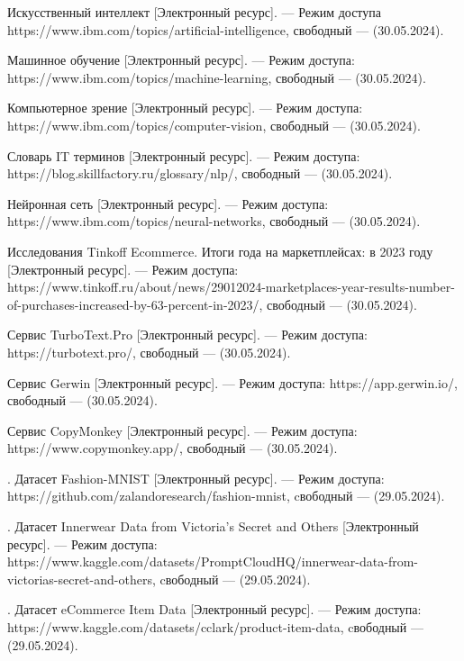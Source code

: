 \newpage 
\printbibliography[heading=bibintoc] 

\begin{thebibliography}{0}
	Искусственный интеллект [Электронный ресурс]. — Режим доступа https://www.ibm.com/topics/artificial-intelligence, свободный — (30.05.2024).
	
	Машинное обучение [Электронный ресурс]. — Режим доступа: https://www.ibm.com/topics/machine-learning, свободный — (30.05.2024).
	
	Компьютерное зрение [Электронный ресурс]. — Режим доступа: https://www.ibm.com/topics/computer-vision, свободный — (30.05.2024). 
	
	Словарь IT терминов [Электронный ресурс]. — Режим доступа: https://blog.skillfactory.ru/glossary/nlp/, свободный — (30.05.2024). 
	
	Нейронная сеть [Электронный ресурс]. — Режим доступа: https://www.ibm.com/topics/neural-networks, свободный — (30.05.2024). 
	
	Исследования Tinkoff Ecommerce. Итоги года на маркетплейсах: в 2023 году [Электронный ресурс]. — Режим доступа: https://www.tinkoff.ru/about/news/29012024-marketplaces-year-results-number-of-purchases-increased-by-63-percent-in-2023/, свободный — (30.05.2024).
	
	Сервис TurboText.Pro [Электронный ресурс]. — Режим доступа: https://turbotext.pro/, свободный — (30.05.2024).
	
	Сервис Gerwin [Электронный ресурс]. — Режим доступа: https://app.gerwin.io/, свободный — (30.05.2024).
	
	Сервис CopyMonkey [Электронный ресурс]. — Режим доступа: https://www.copymonkey.app/, свободный — (30.05.2024).
	
	. Датасет Fashion-MNIST [Электронный ресурс]. — Режим доступа: https://github.com/zalandoresearch/fashion-mnist, cвободный — (29.05.2024).
	
	. Датасет Innerwear Data from Victoria's Secret and Others [Электронный ресурс]. — Режим доступа: https://www.kaggle.com/datasets/PromptCloudHQ/innerwear-data-from-victorias-secret-and-others, cвободный — (29.05.2024).
	
	. Датасет eCommerce Item Data [Электронный ресурс]. — Режим доступа: https://www.kaggle.com/datasets/cclark/product-item-data, cвободный — (29.05.2024).
	

\end{thebibliography}
